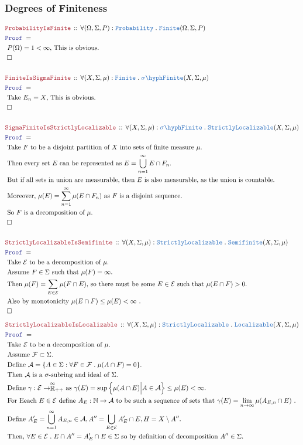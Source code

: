 \documentclass[12pt]{scrartcl}
\newcommand{\TYPE}[1]{\textcolor{NavyBlue}{\mathtt{#1}}}
\newcommand{\LOGIC}[1]{\textcolor{Blue}{\mathtt{#1}}}
\newcommand{\THM}[1]{\textcolor{Maroon}{\mathtt{#1}}}
\renewcommand{\.}{\; . \;}
\newcommand{\Theorem}[2]{& \THM{#1} \, :: \, #2 \\ & \Proof = \\ }
\newcommand{\Page}[1]{ \begin{align*} #1 \end{align*}   }
\newcommand{\Nat}{\mathbb{N} }
\newcommand{\EReals}{\stackrel{\mathclap{\infty}}{\mathbb{R}}}
\newcommand{\QED}{\; \square}
\newcommand{\EndProof}{& \QED \\}
\newcommand{\Proof}{\LOGIC{Proof} \; }
\newcommand{\Explain}[1]{& \text{#1.} \\}
\newcommand{\Finite}{\TYPE{Finite}}
\newcommand{\A}{\mathcal{A}}
\newcommand{\Probability}{\TYPE{Probability}}
\newcommand{\sFinite}{\TYPE{\sigma \hyph  Finite}}
\newcommand{\Semifinite}{\TYPE{Semifinite}}
\newcommand{\SLoc}{\TYPE{StrictlyLocalizable}}
\newcommand{\Loc}{\TYPE{Localizable}}
\newcommand{\F}{\mathcal{F}}
\newcommand{\E}{\mathcal{E}}
\begin{document}
\subsubsection{Degrees of Finiteness}
\Page{
	\Theorem{ProbabilityIsFinite}
	{
		\forall (\Omega,\Sigma,P) : \Probability \.
		\Finite(\Omega,\Sigma,P)
	}
	\Explain{ 
		$P(\Omega) = 1 < \infty $, This is obvious}
	\EndProof
	\\
	\Theorem{FiniteIsSigmaFinite}
	{
		\forall (X,\Sigma,\mu) : \Finite \.
		\sFinite(X,\Sigma,\mu)
	}
	\Explain{ 
		Take $E_n = X$, This is obvious}
	\EndProof
	\\
	\Theorem{SigmaFiniteIsStrictlyLocalizable}
	{
		\forall (X,\Sigma,\mu) : \sFinite \.
		\SLoc(X,\Sigma,\mu)
	}
	\Explain{
		Take $F$ to be a disjoint partition of $X$ into sets of finite measure $\mu$}
	\Explain{
		Then every set $E$ can be represented as
		$E = \bigcup^\infty_{n=1} E \cap F_n$}
	\Explain{
		But if all sets in union are measurable, then $E$ is also measurable, 
		as the union is countable}
	\Explain{
		Moreover, $\mu(E) = \sum^\infty_{n=1} \mu(E \cap F_n)$ as $F$ is a disjoint sequence}
	\Explain{
		So $F$ is a decomposition of $\mu$}
	\EndProof
	\\
	\Theorem{StrictlyLocalizableIsSemifinite}
	{
		\forall (X,\Sigma,\mu) : \SLoc \.
		\Semifinite(X,\Sigma,\mu)
	}
	\Explain{
		Take $\E$ to be a decomposition of $\mu$}
	\Explain{
		Assume $F \in \Sigma$ such that $\mu(F) = \infty$}
	\Explain{
		Then $\mu(F) = \sum_{E \in \E} \mu(F \cap E)$,
	so there must be some $E \in \E$ such that $\mu(E \cap F) > 0$}
	\Explain{
		Also by monotonicity $\mu(E \cap F) \le \mu(E) < \infty$
	}
	\EndProof
}\Page{
	\Theorem{StrictlyLocalizableIsLocalizable}
	{
		\forall (X,\Sigma,\mu) : \SLoc \.
		\Loc(X,\Sigma,\mu)
	}
	\Explain{
		 Take $\E$ to be a decomposition of $\mu$}
	\Explain{
		Assume $\F \subset \Sigma$}
	\Explain{
		Define $\A = \{A\in \Sigma : \forall F \in \F \. \mu(A \cap  F) = 0 \}$}
	\Explain{ 
		Then $\A$ is a $\sigma$-subring and ideal of $\Sigma$}
	\Explain{
		Define $\gamma : \E \to \EReals_{++}$ as $\gamma(E) = \sup\Big\{ \mu(A \cap E) \Big| A \in \A  \Big\}
		\le \mu(E) < \infty$}
	\Explain{
		For Eeach $E \in \E$ define $A_{E} : \Nat \to \A$ to be such a sequence of sets that
		$\gamma(E) = \lim_{n \to \infty} \mu(A_{E,n} \cap E)$
	}
	\Explain{
		Define $A'_E = \bigcup^\infty_{n=1} A_{E,n} \in \A, A''= \bigcup_{E \in \E} A'_E \cap E, H = X\setminus A''$}
	\Explain{
		Then, $\forall E \in \E \. E \cap A'' = A'_E \cap E \in \Sigma$ so by definition of decomposition
		$A'' \in \Sigma$}
}
\end{document}
